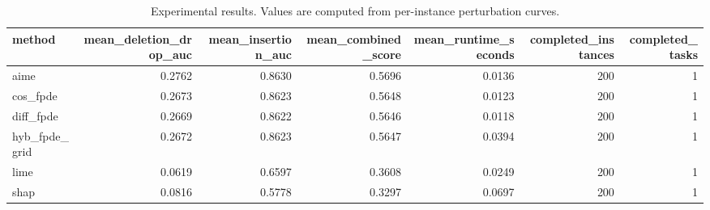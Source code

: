 \begin{table}[t]
\caption{Experimental results. Values are computed from per-instance perturbation curves.}
\label{tab:main_results_computed}
\centering
\begin{tabular}{lrrrrrr}
\toprule
method & mean\_deletion\_drop\_auc & mean\_insertion\_auc & mean\_combined\_score & mean\_runtime\_seconds & completed\_instances & completed\_tasks \\
\midrule
aime & 0.2762 & 0.8630 & 0.5696 & 0.0136 & 200 & 1 \\
cos\_fpde & 0.2673 & 0.8623 & 0.5648 & 0.0123 & 200 & 1 \\
diff\_fpde & 0.2669 & 0.8622 & 0.5646 & 0.0118 & 200 & 1 \\
hyb\_fpde\_grid & 0.2672 & 0.8623 & 0.5647 & 0.0394 & 200 & 1 \\
lime & 0.0619 & 0.6597 & 0.3608 & 0.0249 & 200 & 1 \\
shap & 0.0816 & 0.5778 & 0.3297 & 0.0697 & 200 & 1 \\
\bottomrule
\end{tabular}

\end{table}
